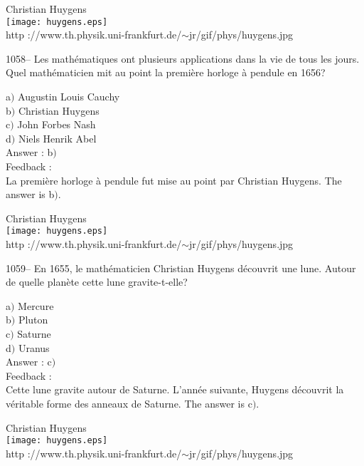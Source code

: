﻿\documentclass[letterpaper, 12pt]{article}
\begin{document}
        \begin{center}
        Christian Huygens\\
    \texttt{[image: huygens.eps]}\\
        {\footnotesize http
://www.th.physik.uni-frankfurt.de/$\sim$jr/gif/phys/huygens.jpg}
    \end{center}

1058-- Les math\'ematiques ont plusieurs applications dans la vie de
tous les jours. Quel math\'ematicien mit au point la premi\`ere
horloge \`a pendule en 1656?

a$)$ Augustin Louis Cauchy \\
b$)$ Christian Huygens  \\
c$)$ John Forbes Nash  \\
d$)$ Niels Henrik Abel \\

Answer : b$)$\\

Feedback : \\
La premi\`ere horloge \`a pendule fut mise au point par Christian
Huygens.
The answer is b$)$.\\

        \begin{center}
        Christian Huygens\\
    \texttt{[image: huygens.eps]}\\
        {\footnotesize http
://www.th.physik.uni-frankfurt.de/$\sim$jr/gif/phys/huygens.jpg}
    \end{center}

1059-- En 1655, le math\'ematicien Christian Huygens d\'ecouvrit une
lune. Autour de quelle plan\`ete cette lune gravite-t-elle?

a$)$ Mercure \\
b$)$ Pluton  \\
c$)$ Saturne  \\
d$)$ Uranus \\

Answer : c$)$\\

Feedback : \\
Cette lune gravite autour de Saturne. L'ann\'ee suivante, Huygens
d\'ecouvrit la v\'eritable forme des anneaux de Saturne.
The answer is c$)$.\\

        \begin{center}
        Christian Huygens\\
    \texttt{[image: huygens.eps]}\\
        {\footnotesize http
://www.th.physik.uni-frankfurt.de/$\sim$jr/gif/phys/huygens.jpg}
    \end{center}
\end{document}
